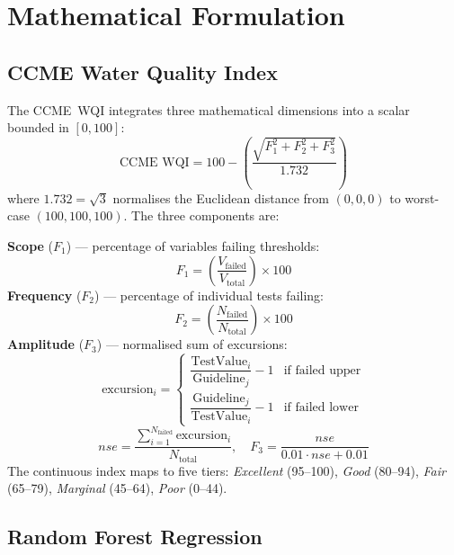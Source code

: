 \documentclass[conference]{IEEEtran}
\begin{document}
\section{Mathematical Formulation}
\label{sec:math}

\subsection{CCME Water Quality Index}

The CCME~WQI integrates three mathematical dimensions into a scalar
bounded in $[0,100]$:
\begin{equation}
  \text{CCME WQI} = 100 - \left(\frac{\sqrt{F_1^2 + F_2^2 + F_3^2}}{1.732}\right)
  \label{eq:ccme}
\end{equation}
where $1.732 = \sqrt{3}$ normalises the Euclidean distance from
$(0,0,0)$ to worst-case $(100,100,100)$. The three components are:

\noindent\textbf{Scope} ($F_1$) --- percentage of variables failing thresholds:
\begin{equation}
  F_1 = \left(\frac{V_{\text{failed}}}{V_{\text{total}}}\right) \times 100
\end{equation}
\noindent\textbf{Frequency} ($F_2$) --- percentage of individual tests failing:
\begin{equation}
  F_2 = \left(\frac{N_{\text{failed}}}{N_{\text{total}}}\right) \times 100
\end{equation}
\noindent\textbf{Amplitude} ($F_3$) --- normalised sum of excursions:
\begin{equation}
  \text{excursion}_i =
    \begin{cases}
      \dfrac{\text{TestValue}_i}{\text{Guideline}_j} - 1
        & \text{if failed upper}\\[6pt]
      \dfrac{\text{Guideline}_j}{\text{TestValue}_i} - 1
        & \text{if failed lower}
    \end{cases}
\end{equation}
\begin{equation}
  nse = \frac{\sum_{i=1}^{N_{\text{failed}}} \text{excursion}_i}{N_{\text{total}}},
  \quad
  F_3 = \frac{nse}{0.01 \cdot nse + 0.01}
\end{equation}
The continuous index maps to five tiers: \emph{Excellent} (95--100),
\emph{Good} (80--94), \emph{Fair} (65--79), \emph{Marginal} (45--64),
\emph{Poor} (0--44).

\subsection{Random Forest Regression}
\end{document}
